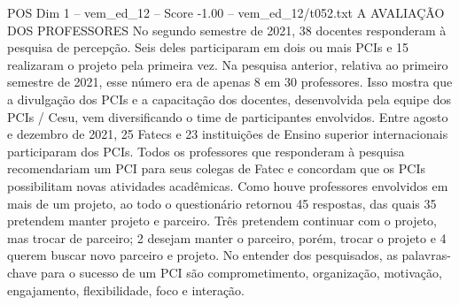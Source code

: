 \begin{textsample}{POS Dim 1 – vem\_ed\_12 – Score -1.00 – vem\_ed\_12/t052.txt}  \label{ex:f1_pos_083}
A AVALIAÇÃO DOS PROFESSORES No segundo semestre de 2021, 38 docentes responderam à pesquisa de percepção.
Seis deles participaram em dois ou mais PCIs e 15 realizaram o projeto pela primeira vez.
Na pesquisa anterior, relativa ao primeiro semestre de 2021, esse número era de apenas 8 em 30 professores.
Isso mostra que a divulgação dos PCIs e a capacitação dos docentes, desenvolvida pela equipe dos PCIs / Cesu, vem diversificando o time de participantes envolvidos.
Entre agosto e dezembro de 2021, 25 Fatecs e 23 instituições de Ensino superior internacionais participaram dos PCIs.
Todos os professores que responderam à pesquisa recomendariam um PCI para seus colegas de Fatec e concordam que os PCIs possibilitam novas atividades acadêmicas.
Como houve professores envolvidos em mais de um projeto, ao todo o questionário retornou 45 respostas, das quais 35 pretendem manter projeto e parceiro.
Três pretendem continuar com o projeto, mas trocar de parceiro; 2 desejam manter o parceiro, porém, trocar o projeto e 4 querem buscar novo parceiro e projeto.
No entender dos pesquisados, as palavras-chave para o sucesso de um PCI são comprometimento, organização, motivação, engajamento, flexibilidade, foco e interação.

\end{textsample}
